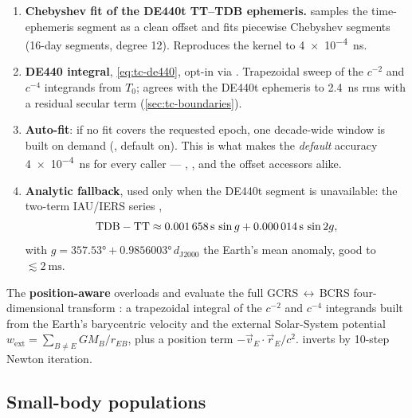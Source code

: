 \begin{enumerate}[leftmargin=*]
  \item \textbf{Chebyshev fit of the DE440t TT--TDB ephemeris.}
     samples the  time-ephemeris
    segment as a clean offset and fits piecewise Chebyshev segments (16-day
    segments, degree 12). Reproduces the kernel to \SI{4e-4}{\nano\second}.
  \item \textbf{DE440 integral}, \cref{eq:tc-de440}, opt-in via
    . Trapezoidal sweep of the
    $c^{-2}$ and $c^{-4}$ integrands from $T_0$; agrees with the DE440t
    ephemeris to \SI{2.4}{\nano\second} rms with a residual secular term
    (\cref{sec:tc-boundaries}).
  \item \textbf{Auto-fit}: if no fit covers the requested epoch, one
    decade-wide window is built on demand (, default on).
    This is what makes the \emph{default} accuracy \SI{4e-4}{\nano\second} for
    every caller --- , , and the offset accessors
    alike.
  \item \textbf{Analytic fallback}, used only when the DE440t segment is
    unavailable: the two-term IAU/IERS series \citep{urban2013},
    \begin{equation}
    \label{eq:tc-series}
      \mathrm{TDB} - \mathrm{TT} \approx
      \SI{0.001658}{\second}\,\sin g + \SI{0.000014}{\second}\,\sin 2g,
    \end{equation}
    with $g = \ang{357.53} + \ang{0.9856003}\,d_{\mathrm{J2000}}$ the Earth's
    mean anomaly, good to $\lesssim\SI{2}{\milli\second}$.
\end{enumerate}

\begin{lupntnote}
The \textbf{position-aware} overloads  and
 evaluate the full GCRS\,$\leftrightarrow$\,BCRS
four-dimensional transform \citep[Eqs.~21--22]{turyshev2026cislunar}: a
trapezoidal integral of the $c^{-2}$ and $c^{-4}$ integrands built from the
Earth's barycentric velocity and the external Solar-System potential
$w_{\mathrm{ext}} = \sum_{B \neq E} GM_B / r_{EB}$, plus a position term
$-\vec{v}_E \cdot \vec{r}_E / c^2$.  inverts by
10-step Newton iteration.
\end{lupntnote}

\subsection{Small-body populations}
\label{sec:tc-smallbody}

